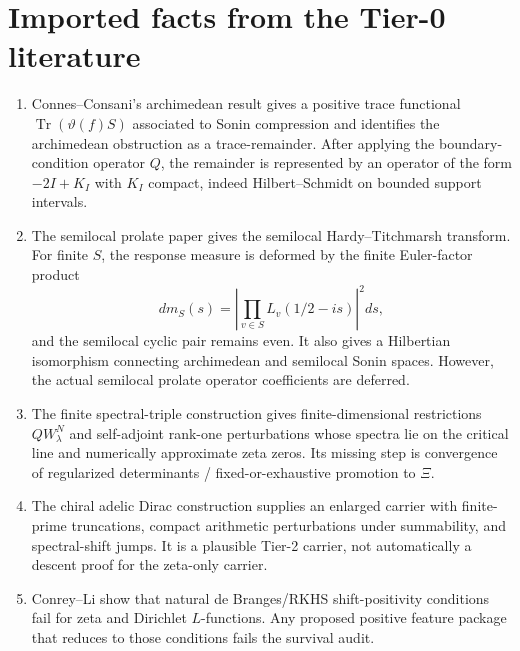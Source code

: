 \documentclass[11pt]{article}
\begin{document}
\section{Imported facts from the Tier-0 literature}
\begin{enumerate}[label=F\arabic*.]
\item Connes--Consani's archimedean result gives a positive trace functional $\operatorname{Tr}(\vartheta(f)S)$ associated to Sonin compression and identifies the archimedean obstruction as a trace-remainder. After applying the boundary-condition operator $Q$, the remainder is represented by an operator of the form $-2I+K_I$ with $K_I$ compact, indeed Hilbert--Schmidt on bounded support intervals.
\item The semilocal prolate paper gives the semilocal Hardy--Titchmarsh transform.  For finite $S$, the response measure is deformed by the finite Euler-factor product
\[
  dm_S(s) = \left|\prod_{v\in S} L_v(1/2-is)\right|^2 ds,
\]
and the semilocal cyclic pair remains even.  It also gives a Hilbertian isomorphism connecting archimedean and semilocal Sonin spaces.  However, the actual semilocal prolate operator coefficients are deferred.
\item The finite spectral-triple construction gives finite-dimensional restrictions $QW_\lambda^N$ and self-adjoint rank-one perturbations whose spectra lie on the critical line and numerically approximate zeta zeros.  Its missing step is convergence of regularized determinants / fixed-or-exhaustive promotion to $\Xi$.
\item The chiral adelic Dirac construction supplies an enlarged carrier with finite-prime truncations, compact arithmetic perturbations under summability, and spectral-shift jumps.  It is a plausible Tier-2 carrier, not automatically a descent proof for the zeta-only carrier.
\item Conrey--Li show that natural de Branges/RKHS shift-positivity conditions fail for zeta and Dirichlet $L$-functions. Any proposed positive feature package that reduces to those conditions fails the survival audit.
\end{enumerate}
\end{document}
